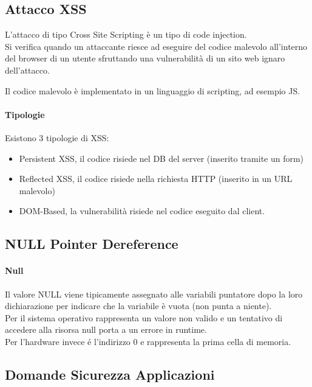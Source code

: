 \documentclass[12pt, a4paper, openany]{book}
\begin{document}
\subsection{Attacco XSS}
L'attacco di tipo Cross Site Scripting è un tipo di code injection.
\\Si verifica quando un attaccante riesce ad eseguire del codice malevolo all'interno del browser di un utente sfruttando una vulnerabilità di un sito web ignaro dell'attacco.

Il codice malevolo è implementato in un linguaggio di scripting, ad esempio JS.

\paragraph{Tipologie}
Esistono 3 tipologie di XSS:
\begin{itemize}
    \item Persistent XSS, il codice risiede nel DB del server (inserito tramite un form)
    \item Reflected XSS, il codice risiede nella richiesta HTTP (inserito in un URL malevolo)
    \item DOM-Based, la vulnerabilità risiede nel codice eseguito dal client.
\end{itemize}

\subsection{NULL Pointer Dereference}
\paragraph{Null} Il valore NULL viene tipicamente assegnato alle variabili puntatore dopo la loro dichiarazione per 
indicare che la variabile è vuota (non punta a niente).
\\Per il sistema operativo rappresenta un valore non valido e un tentativo di accedere alla risorsa null porta a un errore in runtime.
\\Per l'hardware invece é l'indirizzo 0 e rappresenta la prima cella di memoria.


\subsection{Domande Sicurezza Applicazioni}
\end{document}
